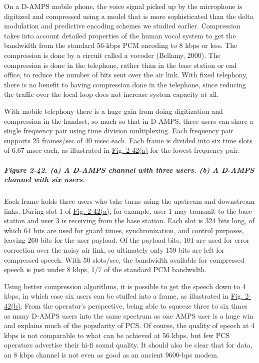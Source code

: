 \documentclass[b5paper,11pt]{memoir}
\begin{document}
On a D-AMPS mobile phone, the voice signal picked up by the microphone
is digitized and compressed using a model that is more sophisticated
than the delta modulation and predictive encoding schemes we studied
earlier. Compression takes into account detailed properties of the human
vocal system to get the bandwidth from the standard 56-kbps PCM encoding
to 8 kbps or less. The compression is done by a circuit called a
{vocoder} (Bellamy, 2000). The compression is done in the telephone,
rather than in the base station or end office, to reduce the number of
bits sent over the air link. With fixed telephony, there is no benefit
to having compression done in the telephone, since reducing the traffic
over the local loop does not increase system capacity at all.

With mobile telephony there is a huge gain from doing digitization and
compression in the handset, so much so that in D-AMPS, three users can
share a single frequency pair using time division multiplexing. Each
frequency pair supports 25 frames/sec of 40 msec each. Each frame is
divided into six time slots of 6.67 msec each, as illustrated in
\protect\hyperlink{0130661023_ch02lev1sec6.htmlux5cux23ch02fig42}{Fig.
2-42(a)} for the lowest frequency pair.

\subparagraph[Figure 2-42. (a) A D-AMPS channel with three users. (b) A
D-AMPS channel with six
users.]{\texorpdfstring{\protect\hypertarget{0130661023_ch02lev1sec6.htmlux5cux23ch02fig42}{}{}Figure
2-42. (a) A D-AMPS channel with three users. (b) A D-AMPS channel with
six
users.}{Figure 2-42. (a) A D-AMPS channel with three users. (b) A D-AMPS channel with six users.}}


Each frame holds three users who take turns using the upstream and
downstream links. During slot 1 of
\protect\hyperlink{0130661023_ch02lev1sec6.htmlux5cux23ch02fig42}{Fig.
2-42(a)}, for example, user 1 may transmit to the base station and user
3 is receiving from the base station. Each slot is 324 bits long, of
which 64 bits are used for guard times, synchronization, and control
purposes, leaving 260 bits for the user payload. Of the payload bits,
101 are used for error correction over the noisy air link, so ultimately
only 159 bits are left for compressed speech. With 50 slots/sec, the
bandwidth available for compressed speech is just under 8 kbps, 1/7 of
the standard PCM bandwidth.

Using better compression algorithms, it is possible to get the speech
down to 4 kbps, in which case six users can be stuffed into a frame, as
illustrated in
\protect\hyperlink{0130661023_ch02lev1sec6.htmlux5cux23ch02fig42}{Fig.
2-42(b)}. From the operator's perspective, being able to squeeze three
to six times as many D-AMPS users into the same spectrum as one AMPS
user is a huge win and explains much of the popularity of PCS. Of
course, the quality of speech at 4 kbps is not comparable to what can be
achieved at 56 kbps, but few PCS operators advertise their hi-fi sound
quality. It should also be clear that for data, an 8 kbps channel is not
even as good as an ancient 9600-bps modem.
\end{document}
